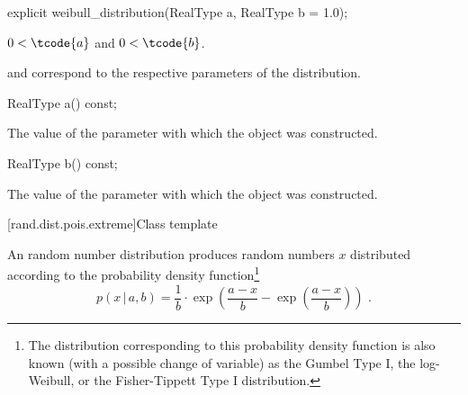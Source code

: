 \begin{indexed}{}
\begin{itemdecl}
explicit weibull_distribution(RealType a, RealType b = 1.0);
\end{itemdecl}%
\end{indexed}

\begin{itemdescr}
\pnum
\expects
$0 < \tcode{a}$ and $0 < \tcode{b}$.

\pnum
\remarks
{} and 
correspond to the respective parameters of the distribution.
\end{itemdescr}

\begin{indexed}{}
\begin{itemdecl}
RealType a() const;
\end{itemdecl}
\end{indexed}

\begin{itemdescr}
\pnum
\returns
The value of the  parameter
 with which the object was constructed.
\end{itemdescr}

\begin{indexed}{}
\begin{itemdecl}
RealType b() const;
\end{itemdecl}
\end{indexed}

\begin{itemdescr}
\pnum
\returns
The value of the  parameter
 with which the object was constructed.
\end{itemdescr}


[rand.dist.pois.extreme]{Class template }
%
%

\pnum
An  random number distribution
produces random numbers $x$
distributed according to
the probability density function\footnote{The distribution corresponding to
 this probability density function
 is also known
 (with a possible change of variable)
 as the Gumbel Type I,
 the log-Weibull,
 or the Fisher-Tippett Type I
 distribution.}%
%
\[ p(x\,|\,a,b) = \frac{1}{b}
     \cdot \exp\left(\frac{a-x}{b} - \exp\left(\frac{a-x}{b}\right)\right)
     \text{ .} \]

